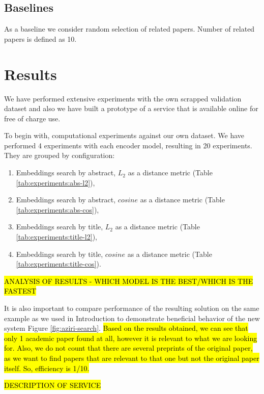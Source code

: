 \documentclass{article}
\begin{document}
    \subsection{Baselines}
        
        As a baseline we consider random selection of related papers. Number of related papers is defined as 10. 

\section{Results}
    We have performed extensive experiments with the own scrapped validation dataset and also we have built a prototype of a service that is available online for free of charge use. 
    
    To begin with, computational experiments against our own dataset. We have performed 4 experiments with each encoder model, resulting in 20 experiments. They are grouped by configuration:
    
    \begin{enumerate}
        \item Embeddings search by abstract, \(L_{2}\) as a distance metric (Table \ref{tab:experiments:abs-l2}),
        \item Embeddings search by abstract, \(cosine\) as a distance metric (Table \ref{tab:experiments:abs-cos}),
        \item Embeddings search by title, \(L_{2}\) as a distance metric (Table \ref{tab:experiments:title-l2}),
        \item Embeddings search by title, \(cosine\) as a distance metric  (Table \ref{tab:experiments:title-cos}).
    \end{enumerate}

    

    \hl{ANALYSIS OF RESULTS - WHICH MODEL IS THE BEST/WHICH IS THE FASTEST}

    It is also important to compare performance of the resulting solution on the same example as we used in Introduction to demonstrate beneficial behavior of the new system Figure \ref{fig:aziri-search}. \hl{Based on the results obtained, we can see that only 1 academic paper found at all, however it is relevant to what we are looking for. Also, we do not count that there are several preprints of the original paper, as we want to find papers that are relevant to that one but not the original paper itself. So, efficiency is 1/10.}

    \hl{DESCRIPTION OF SERVICE}
    
\end{document}
